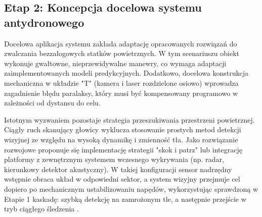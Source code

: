 \documentclass[a4paper,twoside,12pt]{book}
\newcommand{\obcy}[1]{\emph{#1}}
\newcommand{\english}[1]{{\selectlanguage{british}\obcy{#1}}}
\begin{document}
\subsection*{Etap 2: Koncepcja docelowa systemu antydronowego}

Docelowa aplikacja systemu zakłada adaptację opracowanych rozwiązań do zwalczania bezzałogowych statków powietrznych. W tym scenariuszu obiekt wykonuje gwałtowne, nieprzewidywalne manewry, co wymaga adaptacji zaimplementowanych modeli predykcyjnych. Dodatkowo, docelowa konstrukcja mechaniczna w układzie "T" (kamera i laser rozdzielone osiowo) wprowadza zagadnienie błędu paralaksy, który musi być kompensowany programowo w zależności od dystansu do celu.

Istotnym wyzwaniem pozostaje strategia przeszukiwania przestrzeni powietrznej. Ciągły ruch skanujący głowicy wyklucza stosowanie prostych metod detekcji wizyjnej ze względu na wysoką dynamikę i zmienność tła. Jako rozwiązanie rozwojowe proponuje się implementację strategii "skok i patrz" lub integrację platformy z zewnętrznym systemem wczesnego wykrywania (np. radar, kierunkowy detektor akustyczny). W takiej konfiguracji sensor nadrzędny wstępnie obraca układ w odpowiedni sektor, a system wizyjny przejmuje cel dopiero po mechanicznym ustabilizowaniu napędów, wykorzystując sprawdzoną w Etapie 1 kaskadę: szybką detekcję na zamrożonym tle, a następnie przejście w tryb ciągłego śledzenia \cite{bib:Seidaliyeva2020, bib:Kemeshi2024}.






%
\end{document}
